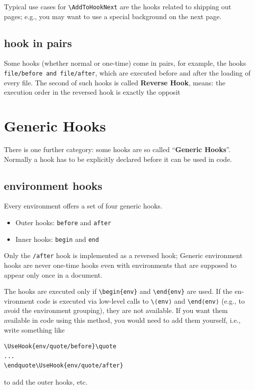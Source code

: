 \documentclass{article}
\newcommand\tbh{\textbackslash}
\begin{document}
Typical use cases for \texttt{\tbh AddToHookNext} are the hooks related
to shipping out pages; e.g., you may want to use a special background on the next
page.

\subsection{hook in pairs}
Some hooks (whether normal or one-time) come in pairs, for example, the hooks
\texttt{file/before and file/after}, which are executed before and after the loading of
every file. The second of such hooks is called \textbf{Reverse Hook}, means: the execution
order in the reversed hook is exactly the opposit


\section{Generic Hooks}
There is one further category: some hooks are so called “\textbf{Generic Hooks}”. Normally
a hook has to be explicitly declared before it can be used in code.

\subsection{environment hooks}
Every environment offers a set of four generic hooks. 
\begin{itemize}
  \item Outer hooks: \texttt{before} and \texttt{after}
  \item Inner hooks: \texttt{begin} and \texttt{end}
\end{itemize}

Only the \texttt{/after} hook is implemented as a reversed hook; Generic environment hooks are never one-time
hooks even with environments that are supposed to appear only once in a document.

The hooks are executed only if \texttt{\tbh begin\{env\}} and \texttt{\tbh end\{env\}} are used. If the en-
vironment code is executed via low-level calls to \texttt{\tbh⟨env⟩} and \texttt{\tbh end⟨env⟩} (e.g., to avoid
the environment grouping), they are not available. If you want them available in code
using this method, you would need to add them yourself, i.e., write something like
\begin{lstlisting}
\UseHook{env/quote/before}\quote
...
\endquote\UseHook{env/quote/after}
\end{lstlisting}

to add the outer hooks, etc.
\end{document}
